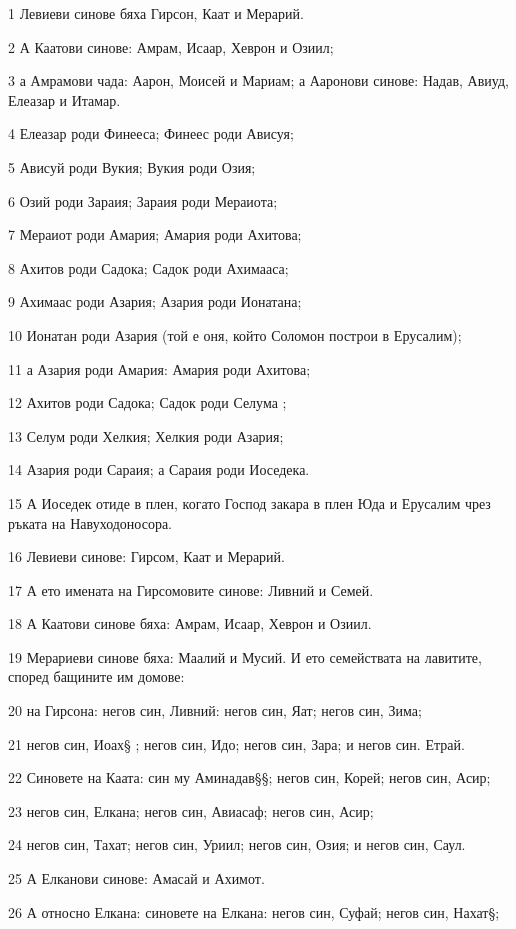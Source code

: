 \par 1 Левиеви синове бяха Гирсон, Каат и Мерарий.
\par 2 А Каатови синове: Амрам, Исаар, Хеврон и Озиил;
\par 3 а Амрамови чада: Аарон, Моисей и Мариам; а Ааронови синове: Надав, Авиуд, Елеазар и Итамар.
\par 4 Елеазар роди Финееса; Финеес роди Ависуя;
\par 5 Ависуй роди Вукия; Вукия роди Озия;
\par 6 Озий роди Зараия; Зараия роди Мераиота;
\par 7 Мераиот роди Амария; Амария роди Ахитова;
\par 8 Ахитов роди Садока; Садок роди Ахимааса;
\par 9 Ахимаас роди Азария; Азария роди Ионатана;
\par 10 Ионатан роди Азария (той е оня, който Соломон построи в Ерусалим);
\par 11 а Азария роди Амария: Амария роди Ахитова;
\par 12 Ахитов роди Садока; Садок роди Селума ;
\par 13 Селум роди Хелкия; Хелкия роди Азария;
\par 14 Азария роди Сараия; а Сараия роди Иоседека.
\par 15 А Иоседек отиде в плен, когато Господ закара в плен Юда и Ерусалим чрез ръката на Навуходоносора.
\par 16 Левиеви синове: Гирсом, Каат и Мерарий.
\par 17 А ето имената на Гирсомовите синове: Ливний и Семей.
\par 18 А Каатови синове бяха: Амрам, Исаар, Хеврон и Озиил.
\par 19 Мерариеви синове бяха: Маалий и Мусий. И ето семействата на лавитите, според бащините им домове:
\par 20 на Гирсона: негов син, Ливний: негов син, Яат; негов син, Зима;
\par 21 негов син, Иоах§ ; негов син, Идо; негов син, Зара; и негов син. Етрай.
\par 22 Синовете на Каата: син му Аминадав§§; негов син, Корей; негов син, Асир;
\par 23 негов син, Елкана; негов син, Авиасаф; негов син, Асир;
\par 24 негов син, Тахат; негов син, Уриил; негов син, Озия; и негов син, Саул.
\par 25 А Елканови синове: Амасай и Ахимот.
\par 26 А относно Елкана: синовете на Елкана: негов син, Суфай; негов син, Нахат§;
